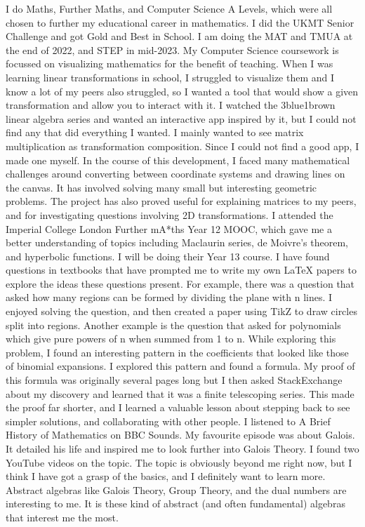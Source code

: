 \documentclass[a4paper, 12pt]{article}
\newenvironment{personalstatement}{\directlua{startPersonalStatement()}}{\directlua{stopPersonalStatement()}}
\begin{document}
\begin{personalstatement}
I do Maths, Further Maths, and Computer Science A Levels, which were all chosen to further my educational career in mathematics. I did the UKMT Senior Challenge and got Gold and Best in School. I am doing the MAT and TMUA at the end of 2022, and STEP in mid-2023.
My Computer Science coursework is focussed on visualizing mathematics for the benefit of teaching. When I was learning linear transformations in school, I struggled to visualize them and I know a lot of my peers also struggled, so I wanted a tool that would show a given transformation and allow you to interact with it. I watched the 3blue1brown linear algebra series and wanted an interactive app inspired by it, but I could not find any that did everything I wanted. I mainly wanted to see matrix multiplication as transformation composition. Since I could not find a good app, I made one myself. In the course of this development, I faced many mathematical challenges around converting between coordinate systems and drawing lines on the canvas. It has involved solving many small but interesting geometric problems. The project has also proved useful for explaining matrices to my peers, and for investigating questions involving 2D transformations.
I attended the Imperial College London Further mA*ths Year 12 MOOC, which gave me a better understanding of topics including Maclaurin series, de Moivre's theorem, and hyperbolic functions. I will be doing their Year 13 course.
I have found questions in textbooks that have prompted me to write my own LaTeX papers to explore the ideas these questions present. For example, there was a question that asked how many regions can be formed by dividing the plane with n lines. I enjoyed solving the question, and then created a paper using TikZ to draw circles split into regions. Another example is the question that asked for polynomials which give pure powers of n when summed from 1 to n. While exploring this problem, I found an interesting pattern in the coefficients that looked like those of binomial expansions. I explored this pattern and found a formula. My proof of this formula was originally several pages long but I then asked StackExchange about my discovery and learned that it was a finite telescoping series. This made the proof far shorter, and I learned a valuable lesson about stepping back to see simpler solutions, and collaborating with other people.
I listened to A Brief History of Mathematics on BBC Sounds. My favourite episode was about Galois. It detailed his life and inspired me to look further into Galois Theory. I found two YouTube videos on the topic. The topic is obviously beyond me right now, but I think I have got a grasp of the basics, and I definitely want to learn more. Abstract algebras like Galois Theory, Group Theory, and the dual numbers are interesting to me. It is these kind of abstract (and often fundamental) algebras that interest me the most.

\end{personalstatement}
\end{document}
